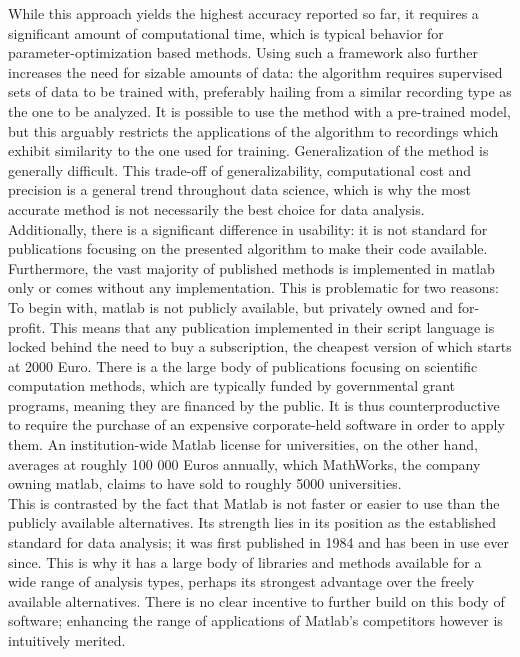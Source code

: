 \documentclass[titlepage]{article}
\begin{document}
While this approach yields the highest accuracy reported so far, it requires a significant amount of computational time, which is typical behavior for parameter-optimization based methods. Using such a framework also further increases the need for sizable amounts of data: the algorithm requires supervised sets of data to be trained with, preferably hailing from a similar recording type as the one to be analyzed\cite{theis_benchmarking_2016}. It is possible to use the method with a pre-trained model, but this arguably restricts the applications of the algorithm to recordings which exhibit similarity to the one used for training. Generalization of the method is generally difficult.
This trade-off of generalizability, computational cost and precision is a general trend throughout data science\cite{agarwalalekh_computational_2012}, which is why the most accurate method is not necessarily the best choice for data analysis. \\
Additionally, there is a significant difference in usability: it is not standard for publications focusing on the presented algorithm to make their code available. Furthermore, the vast majority of published methods is implemented in matlab only\cite{sasaki_fast_2008}\cite{vogelstein_spike_2009}\cite{deneux_accurate_2016}\cite{ozden_identification_2008}\cite{romano_integrated_2017} or comes without any implementation\cite{kerr_imaging_2005}\cite{ranganathan_optical_2010}.
This is problematic for two reasons: \\
To begin with, matlab is not publicly available, but privately owned and for-profit. This means that any publication implemented in their script language is locked behind the need to buy a subscription, the cheapest version of which starts at 2000 Euro\cite{noauthor_new_nodate}. 
There is a the large body of publications focusing on scientific computation methods, which are typically funded by governmental grant programs, meaning they are financed by the public. It is thus counterproductive to require the purchase of an expensive corporate-held software in order to apply them. An institution-wide Matlab license for universities, on the other hand, averages at roughly 100 000 Euros annually, which MathWorks, the company owning matlab, claims to have sold to roughly 5000 universities.\cite{noauthor_matlab-lizenz_nodate}\\
This is contrasted by the fact that Matlab is not faster or easier to use than the publicly available alternatives\cite{noauthor_performancepython_nodate}. Its strength lies in its position as the established standard for data analysis; it was first published in 1984 and has been in use ever since. This is why it has a large body of libraries and methods available for a wide range of analysis types, perhaps its strongest advantage over the freely available alternatives. There is no clear incentive to further build on this body of software; enhancing the range of applications of Matlab's competitors however is intuitively merited.\\
\end{document}

